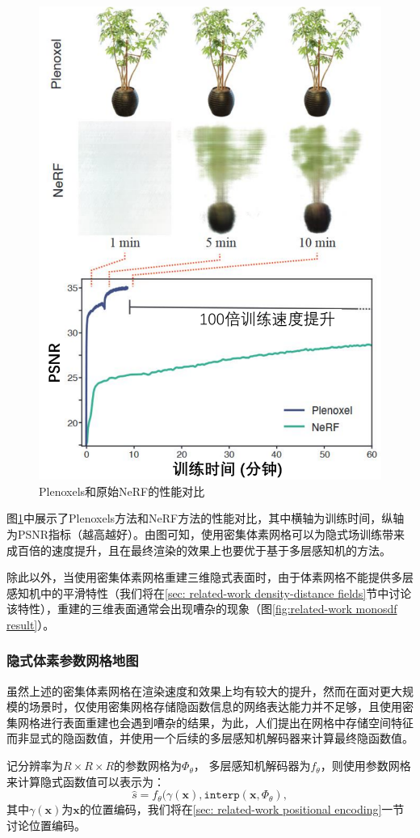 \begin{figure}[h]
    \centering
    \includegraphics[width=.5\textwidth]{undergraduate-thesis/images/related-work/plenoxels-result.pdf}
    \caption{Plenoxels\cite{fridovich-keil_plenoxels_2022}和原始NeRF\cite{mildenhall_nerf_2020}的性能对比}
    \label{fig:related-work plenoxels-result}
\end{figure}

图\ref{fig:related-work plenoxels-result}中展示了Plenoxels方法和NeRF方法的性能对比，其中横轴为训练时间，纵轴为PSNR指标（越高越好）。由图可知，使用密集体素网格可以为隐式场训练带来成百倍的速度提升，且在最终渲染的效果上也要优于基于多层感知机的方法。

除此以外，当使用密集体素网格重建三维隐式表面时，由于体素网格不能提供多层感知机中的平滑特性（我们将在\ref{sec: related-work density-distance fields}节中讨论该特性），重建的三维表面通常会出现嘈杂的现象（图\ref{fig:related-work monosdf result}）。

\subsubsection{隐式体素参数网格地图}
虽然上述的密集体素网格在渲染速度和效果上均有较大的提升，然而在面对更大规模的场景时，仅使用密集网格存储隐函数信息的网络表达能力并不足够，且使用密集网格进行表面重建也会遇到嘈杂的结果，为此，人们提出在网格中存储空间特征而非显式的隐函数值\cite{liu_neural_2021, takikawa_neural_2021, yu_monosdf_2022, huang_di-fusion_2021, peng_convolutional_2020}，并使用一个后续的多层感知机解码器来计算最终隐函数值。

记分辨率为$R\times R\times R$的参数网格为$\Phi_\theta$， 多层感知机解码器为$f_\theta$，则使用参数网格来计算隐式函数值可以表示为：
\begin{equation}
    \hat{s} = f_\theta(\gamma(\mathbf{x}), \mathtt{interp}(\mathbf{x}, \Phi_\theta),
\end{equation}
其中$\gamma(\mathbf{x})$为$\mathbf{x}$的位置编码，我们将在\ref{sec: related-work positional encoding}一节讨论位置编码。

